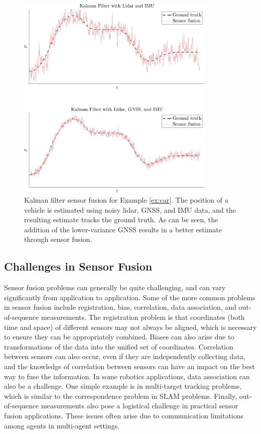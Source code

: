 \begin{example}
\begin{figure}[ht!]
    \centering
    \includegraphics[width=0.85\textwidth]{tex/figs/ch19_figs/carKFfusion.png}
    \caption{Kalman filter sensor fusion for Example \ref{ex:car}. The position of a vehicle is estimated using noisy lidar, GNSS, and IMU data, and the resulting estimate tracks the ground truth. As can be seen, the addition of the lower-variance GNSS results in a better estimate through sensor fusion.}
    \label{fig:fusionexample}
\end{figure}
\end{example}


\subsection{Challenges in Sensor Fusion}
Sensor fusion problems can generally be quite challenging, and can vary significantly from application to application. Some of the more common problems in sensor fusion include registration, bias, correlation, data association, and out-of-sequence measurements.
The registration problem is that coordinates (both time and space) of different sensors may not always be aligned, which is necessary to ensure they can be appropriately combined. Biases can also arise due to transformations of the data into the unified set of coordinates. Correlation between sensors can also occur, even if they are independently collecting data, and the knowledge of correlation between sensors can have an impact on the best way to fuse the information. In some robotics applications, data association can also be a challenge. One simple example is in multi-target tracking problems, which is similar to the correspondence problem in SLAM problems. Finally, out-of-sequence measurements also pose a logistical challenge in practical sensor fusion applications. These issues often arise due to communication limitations among agents in multi-agent settings.